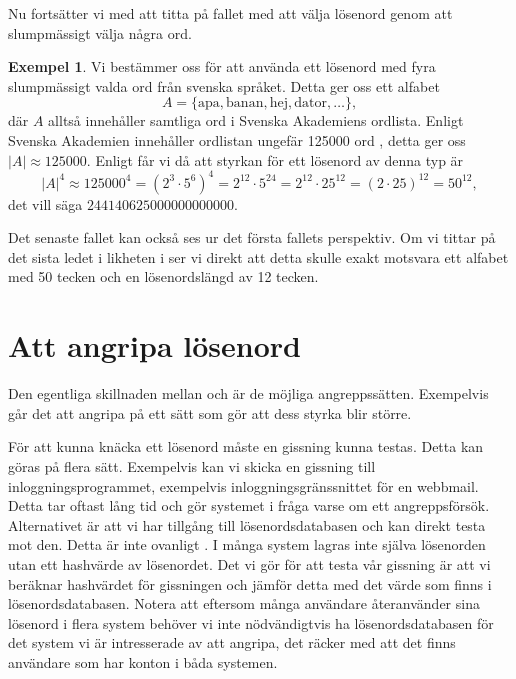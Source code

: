 \documentclass[a4paper]{article}
\theoremstyle{definition}
\newtheorem{example}{Exempel}
\theoremstyle{remark}
\begin{document}
Nu fortsätter vi med att titta på fallet med att välja lösenord genom att
slumpmässigt välja några ord.
\begin{example}\label{ex:words}
  Vi bestämmer oss för att använda ett lösenord med fyra slumpmässigt valda
  ord från svenska språket.
  Detta ger oss ett alfabet \[A = \{\text{apa}, \text{banan}, \text{hej}, 
  \text{dator}, \ldots\},\]
  där \(A\) alltså innehåller samtliga ord i Svenska Akademiens ordlista.
  Enligt Svenska Akademien innehåller ordlistan ungefär 125000 ord \cite{SAOL}, 
  detta ger oss \(|A| \approx 125000\).
  Enligt  får vi då att styrkan för ett lösenord 
  av denna typ är
  \begin{equation}\label{eq:AntalUtfallOrd}
    |A|^4 \approx 125000^4 = (2^3\cdot 5^6)^4
      = 2^{12}\cdot 5^{24}
      = 2^{12}\cdot 25^{12}
      = (2\cdot 25)^{12} = 50^{12},
  \end{equation}
  det vill säga \(244140625000000000000.\)
\end{example}
Det senaste fallet kan också ses ur det första fallets perspektiv.
Om vi tittar på det sista ledet i likheten i  ser 
vi direkt att detta skulle exakt motsvara ett alfabet med 50 tecken och en 
lösenordslängd av 12 tecken.


\section{Att angripa lösenord}
\label{sec:attack}
Den egentliga skillnaden mellan  och 
 är de möjliga angreppssätten.
Exempelvis går det att angripa  på ett sätt som gör att 
dess styrka blir större.

För att kunna knäcka ett lösenord måste en gissning kunna testas.
Detta kan göras på flera sätt.
Exempelvis kan vi skicka en gissning till inloggningsprogrammet, exempelvis 
inloggningsgränssnittet för en webbmail.
Detta tar oftast lång tid och gör systemet i fråga varse om ett angreppsförsök.
Alternativet är att vi har tillgång till lösenordsdatabasen och kan direkt 
testa mot den.
Detta är inte ovanligt 
\citep[jmf.][]{Cubrilovic2009rhf,Oberheide2010bao,Hunt2011abs,Cluley2012twp}.
I många system lagras inte själva lösenorden utan ett hashvärde av lösenordet.
Det vi gör för att testa vår gissning är att vi beräknar hashvärdet för 
gissningen och jämför detta med det värde som finns i lösenordsdatabasen.
Notera att eftersom många användare återanvänder sina lösenord i flera system 
behöver vi inte nödvändigtvis ha lösenordsdatabasen för det system vi är 
intresserade av att angripa, det räcker med att det finns användare som har 
konton i båda systemen.
\end{document}
